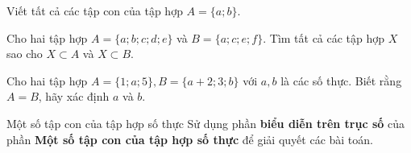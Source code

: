 \begin{vd}%
	Viết tất cả các tập con của tập hợp $A=\{a; b\}$.
\end{vd}
\begin{vd}%
	Cho hai tập hợp $A=\{a;b;c;d;e\}$ và $B=\{a;c;e;f\}$. Tìm tất cả các tập hợp $X$ sao cho $X\subset A$ và $X\subset B$.
\end{vd}
\begin{vd}
	Cho hai tập hợp $A=\{1 ; a ; 5\}, B=\{a+2 ; 3 ; b\}$ với $a, b$ là các số thực. Biết rằng $A=B$, hãy xác định $a$ và $b$.
\end{vd}
\begin{dang}{Một số tập con của tập hợp số thực}
	Sử dụng phần \textbf{biểu diễn trên trục số} của phần \textbf{Một số tập con của tập hợp số thực} để giải quyết các bài toán.
\end{dang}
